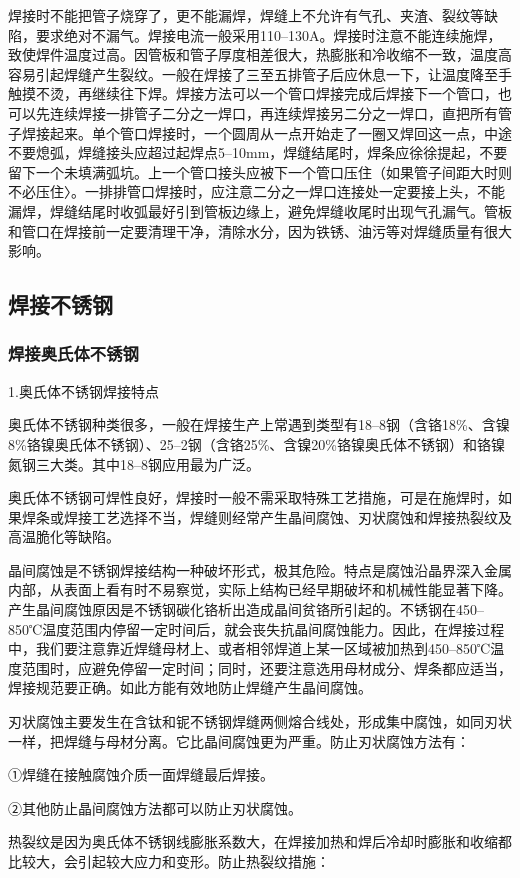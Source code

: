 \documentclass{ctexbook}
\begin{document}
焊接时不能把管子烧穿了，更不能漏焊，焊缝上不允许有气孔、夹渣、裂纹等缺陷，要求绝对不漏气。焊接电流一般采用110--130A。焊接时注意不能连续施焊，致使焊件温度过高。因管板和管子厚度相差很大，热膨胀和冷收缩不一致，温度高容易引起焊缝产生裂纹。一般在焊接了三至五排管子后应休息一下，让温度降至手触摸不烫，再继续往下焊。焊接方法可以一个管口焊接完成后焊接下一个管口，也可以先连续焊接一排管子二分之一焊口，再连续焊接另二分之一焊口，直把所有管子焊接起来。单个管口焊接时，一个圆周从一点开始走了一圈又焊回这一点，中途不要熄弧，焊缝接头应超过起焊点5--10mm，焊缝结尾时，焊条应徐徐提起，不要留下一个未填满弧坑。上一个管口接头应被下一个管口压住（如果管子间距大时则不必压住〉。一排排管口焊接时，应注意二分之一焊口连接处一定要接上头，不能漏焊，焊缝结尾时收弧最好引到管板边缘上，避免焊缝收尾时出现气孔漏气。管板和管口在焊接前一定要清理干净，清除水分，因为铁锈、油污等对焊缝质量有很大影响。
\subsection{焊接不锈钢}
\subsubsection{焊接奥氏体不锈钢}
1.奥氏体不锈钢焊接特点

奥氏体不锈钢种类很多，一般在焊接生产上常遇到类型有18--8钢（含铬18\%、含镍8\%铬镍奥氏体不锈钢）、25--2钢（含铬25\%、含镍20\%铬镍奥氏体不锈钢）和铬镍氮钢三大类。其中18--8钢应用最为广泛。

奥氏体不锈钢可焊性良好，焊接时一般不需采取特殊工艺措施，可是在施焊时，如果焊条或焊接工艺选择不当，焊缝则经常产生晶间腐蚀、刃状腐蚀和焊接热裂纹及高温脆化等缺陷。

晶间腐蚀是不锈钢焊接结构一种破坏形式，极其危险。特点是腐蚀沿晶界深入金属内部，从表面上看有时不易察觉，实际上结构已经早期破坏和机械性能显著下降。产生晶间腐蚀原因是不锈钢碳化铬析出造成晶间贫铬所引起的。不锈钢在450--850℃温度范围内停留一定时间后，就会丧失抗晶间腐蚀能力。因此，在焊接过程中，我们要注意靠近焊缝母材上、或者相邻焊道上某一区域被加热到450--850℃温度范围时，应避免停留一定时间；同时，还要注意选用母材成分、焊条都应适当，焊接规范要正确。如此方能有效地防止焊缝产生晶间腐蚀。

刃状腐蚀主要发生在含钛和铌不锈钢焊缝两侧熔合线处，形成集中腐蚀，如同刃状一样，把焊缝与母材分离。它比晶间腐蚀更为严重。防止刃状腐蚀方法有：

①焊缝在接触腐蚀介质一面焊缝最后焊接。

②其他防止晶间腐蚀方法都可以防止刃状腐蚀。

热裂纹是因为奥氏体不锈钢线膨胀系数大，在焊接加热和焊后冷却时膨胀和收缩都比较大，会引起较大应力和变形。防止热裂纹措施：
\end{document}
